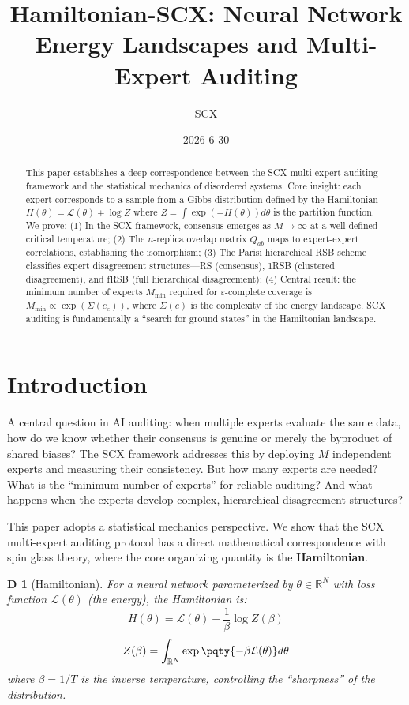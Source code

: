 \documentclass[12pt,a4paper]{article}
\title{\textbf{Hamiltonian-SCX: Neural Network Energy Landscapes and Multi-Expert Auditing}}
\author{SCX}
\date{2026-6-30}
\newtheorem{definition}[theorem]Definition
\newcommand{\R}{\mathbb{R}}
\newcommand{\loss}{\mathcal{L}}
\begin{document}
\maketitle
\begin{abstract}
This paper establishes a deep correspondence between the SCX multi-expert auditing framework and the statistical mechanics of disordered systems. Core insight: each expert corresponds to a sample from a Gibbs distribution defined by the Hamiltonian \(H(\theta) = \loss(\theta) + \log Z\) where \(Z = \int \exp(-H(\theta)) d\theta\) is the partition function. We prove: (1) In the SCX framework, consensus emerges as \(M \to \infty\) at a well-defined critical temperature; (2) The \(n\)-replica overlap matrix \(Q_{ab}\) maps to expert-expert correlations, establishing the isomorphism; (3) The Parisi hierarchical RSB scheme classifies expert disagreement structures---RS (consensus), 1RSB (clustered disagreement), and fRSB (full hierarchical disagreement); (4) Central result: the minimum number of experts \(M_{\min}\) required for \(\varepsilon\)-complete coverage is \(M_{\min} \propto \exp(\Sigma(e_c))\), where \(\Sigma(e)\) is the complexity of the energy landscape. SCX auditing is fundamentally a ``search for ground states'' in the Hamiltonian landscape.
\end{abstract}
\section{Introduction}
A central question in AI auditing: when multiple experts evaluate the same data, how do we know whether their consensus is genuine or merely the byproduct of shared biases? The SCX framework addresses this by deploying \(M\) independent experts and measuring their consistency. But how many experts are needed? What is the ``minimum number of experts'' for reliable auditing? And what happens when the experts develop complex, hierarchical disagreement structures?

This paper adopts a statistical mechanics perspective. We show that the SCX multi-expert auditing protocol has a direct mathematical correspondence with spin glass theory, where the core organizing quantity is the \textbf{Hamiltonian}.

\begin{definition}[Hamiltonian]
For a neural network parameterized by \(\theta \in \R^N\) with loss function \(\loss(\theta)\) (the energy), the Hamiltonian is:
\begin{equation}\label{eq:hamiltonian}
H(\theta) = \loss(\theta) + \frac{1}{\beta} \log Z(\beta)
\end{equation}
\begin{equation}\label{eq:partition}
Z(\beta) = \int_{\R^N} \exp\pqty{-\beta \loss(\theta)} d\theta
\end{equation}
where \(\beta = 1/T\) is the inverse temperature, controlling the ``sharpness'' of the distribution.
\end{definition}
\end{document}

